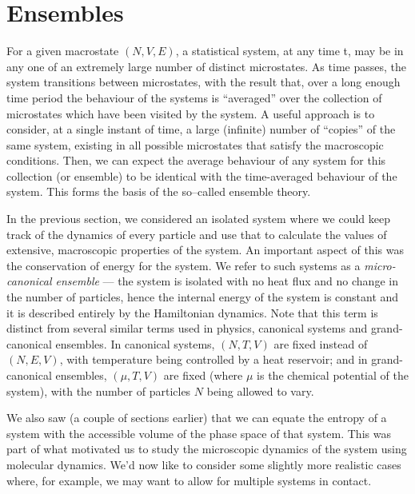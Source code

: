 \section{Ensembles}

For a given macrostate $(N, V, E)$, a statistical system, at any time t, may be in any one of an extremely large number of distinct microstates. As time passes, the system transitions between microstates, with the result that, over a long enough time period the behaviour of the systems is ``averaged'' over the collection of microstates which have been visited by the system.
A useful approach is to consider, at a single instant of time, a large (infinite) number of ``copies'' of the same system, existing in all possible microstates that satisfy the macroscopic conditions. Then, we can expect the average behaviour of any system for this collection (or ensemble) to be identical with the time-averaged behaviour of the system. This forms the basis of the so–called ensemble theory.

In the previous section, we considered an isolated system where we could keep track of the dynamics of every particle and use that to calculate the values of extensive, macroscopic properties of the system. An important aspect of this was the conservation of energy for the system. We refer to such systems as a \emph{micro-canonical ensemble} --- the system is isolated with no heat flux and no change in the number of particles, hence the internal energy of the system is constant and it is described entirely by the Hamiltonian dynamics. Note that this term is distinct from several similar terms used in physics, canonical systems and grand-canonical ensembles. In canonical systems, $(N, T, V)$ are fixed instead of $(N, E, V)$, with temperature being controlled by a heat reservoir; and in grand-canonical ensembles, $(\mu, T, V)$ are fixed (where $\mu$ is the chemical potential of the system), with the number of particles $N$ being allowed to vary.

We also saw (a couple of sections earlier) that we can equate the entropy of a system with the accessible volume of the phase space of that system. This was part of what motivated us to study the microscopic dynamics of the system using molecular dynamics.  We'd now like to consider some slightly more realistic cases where, for example, we may want to allow for multiple systems in contact.

